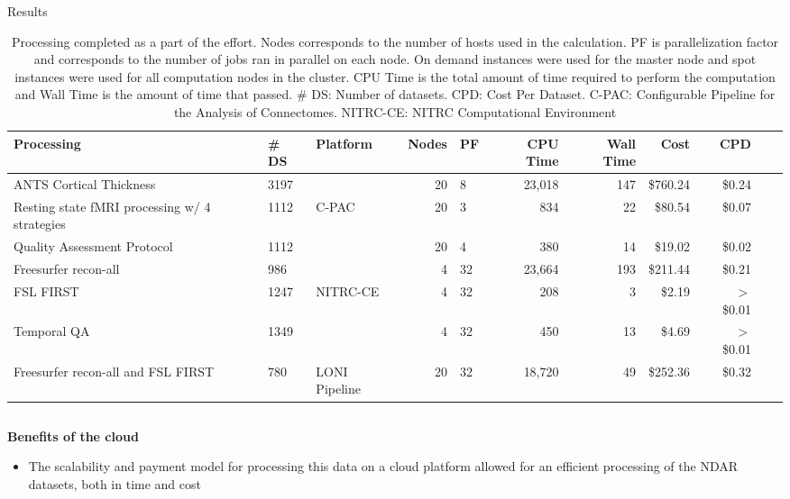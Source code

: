 \documentclass[final,hyperref={pdfpagelabels=false}]{beamer}
\begin{document}
\begin{frame}
\begin{columns}
\begin{column}{.5\textwidth}
{\begin{block}{Results}
\begin{center}
\begin{table}
                    \caption{Processing completed as a part of the effort. Nodes corresponds to the number of hosts used in the calculation. PF is parallelization factor and corresponds to the number of jobs ran in parallel on each node. On demand instances were used for the master node and spot instances were used for all computation nodes in the cluster. CPU Time is the total amount of time required to perform the computation and Wall Time is the amount of time that passed. \# DS: Number of datasets. CPD: Cost Per Dataset. C-PAC: Configurable Pipeline for the Analysis of Connectomes. NITRC-CE: NITRC Computational Environment}
                    \begin{tabularx}{\textwidth}{XXlrl*{6}{r}}
                        {\bf Processing} & {\bf \# DS} & {\bf Platform} & {\bf Nodes} & {\bf PF} & {\bf CPU Time} & {\bf Wall Time} & {\bf Cost} & {\bf CPD}\\
                        \hline
                        ANTS Cortical Thickness & 3197 &  & 20 & 8 & 23,018 & 147 & \$760.24 & \$0.24\\
                        Resting state fMRI processing w/ 4 strategies & 1112 & C-PAC  & 20 & 3 & 834 & 22 & \$80.54 & \$0.07\\
                        Quality Assessment Protocol & 1112 & & 20 & 4 & 380 & 14 & \$19.02 & \$0.02\\
                        \hline
                        Freesurfer recon-all & 986 &  & 4 & 32 & 23,664 & 193 & \$211.44 & \$0.21\\
                        FSL FIRST & 1247 & NITRC-CE & 4 & 32 & 208 & 3 & \$2.19 & $>$ \$0.01\\
                        Temporal QA & 1349 &  & 4 & 32 & 450 & 13 & \$4.69 & $>$ \$0.01\\
                        \hline
                        Freesurfer recon-all and FSL FIRST & 780 & LONI Pipeline & 20 & 32 & 18,720 & 49 & \$252.36 & \$0.32\\
                    \end{tabularx}
                \end{table}
            \end{center}
          \begin{column}{.47\textwidth}
              {\bf Benefits of the cloud}
              \begin{itemize}
                  \item The scalability and payment model for processing this data on a cloud platform allowed for an efficient processing of the NDAR datasets, both in time and cost

\end{itemize}
\end{column}
\end{block}}
\end{column}
\end{columns}
\end{frame}
\end{document}
